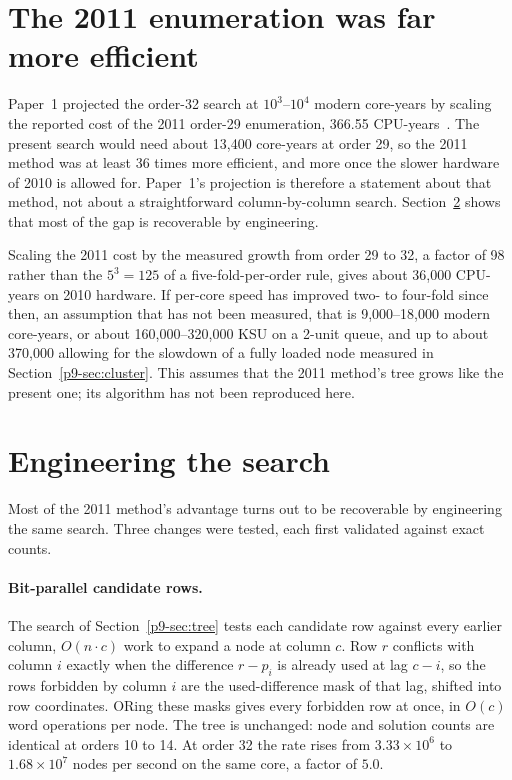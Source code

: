 \documentclass[11pt,a4paper,oneside]{report}
\theoremstyle{definition}
\begin{document}
\section{The 2011 enumeration was far more efficient}
\label{p9-sec:legacy}
Paper~1 projected the order-32 search at $10^3$--$10^4$ modern core-years by scaling the reported cost of
the 2011 order-29 enumeration, 366.55 CPU-years~\cite{p9-drakakis29}. The present search would need about
13{,}400 core-years at order 29, so the 2011 method was at least 36 times more efficient, and more once
the slower hardware of 2010 is allowed for. Paper~1's projection is therefore a statement about that
method, not about a straightforward column-by-column search. Section~\ref{p9-sec:engineering} shows that
most of the gap is recoverable by engineering.

Scaling the 2011 cost by the measured growth from order 29 to 32, a factor of 98 rather than the $5^3=125$
of a five-fold-per-order rule, gives about 36{,}000 CPU-years on 2010 hardware. If per-core speed has
improved two- to four-fold since then, an assumption that has not been measured, that is
9{,}000--18{,}000 modern core-years, or about 160{,}000--320{,}000 KSU on a 2-unit queue, and up to about 370{,}000 allowing for the
slowdown of a fully loaded node measured in Section~\ref{p9-sec:cluster}. This assumes that
the 2011 method's tree grows like the present one; its algorithm has not been reproduced here.

\section{Engineering the search}
\label{p9-sec:engineering}
Most of the 2011 method's advantage turns out to be recoverable by engineering the same search. Three
changes were tested, each first validated against exact counts.

\paragraph{Bit-parallel candidate rows.} The search of Section~\ref{p9-sec:tree} tests each candidate row
against every earlier column, $O(n\cdot c)$ work to expand a node at column $c$. Row $r$ conflicts with
column $i$ exactly when the difference $r-p_i$ is already used at lag $c-i$, so the rows forbidden by
column $i$ are the used-difference mask of that lag, shifted into row coordinates. ORing these masks gives
every forbidden row at once, in $O(c)$ word operations per node. The tree is unchanged: node and
solution counts are identical at orders 10 to 14. At order 32 the rate rises from $3.33\times10^6$ to
$1.68\times10^7$ nodes per second on the same core, a factor of $5.0$.
\end{document}
